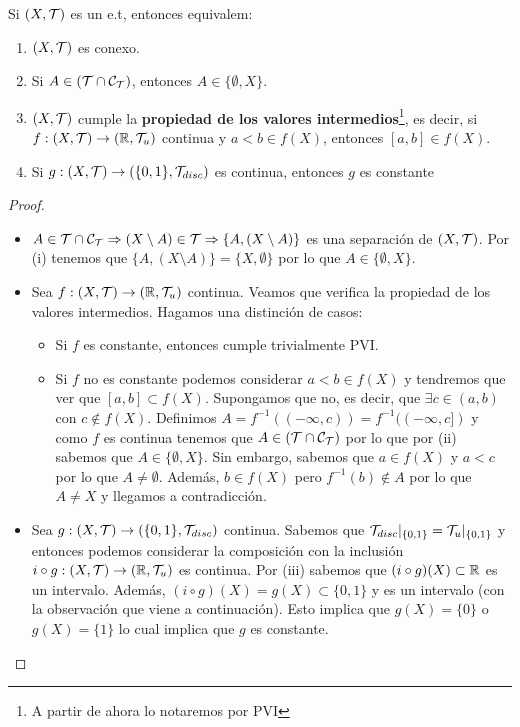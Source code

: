 \begin{teo}
    Si $(X, \mathcal{T})$ es un e.t, entonces equivalem:
    \begin{enumerate}
        \item[(i)] $(X, \mathcal{T})$ es conexo.
        \item[(ii)] Si $A\in (\mathcal{T}\cap \mathcal{C}_{\mathcal{T}})$, entonces $A\in\{\emptyset, X\}$.
        \item[(iii)] $(X, \mathcal{T})$ cumple la \textbf{propiedad de los valores intermedios}\footnote{A partir de ahora lo notaremos por PVI}, es decir, si $f:(X, \mathcal{T})\to (\mathbb{R}, \mathcal{T}_u)$ continua y $a<b\in f(X)$, entonces $[a,b]\in f(X)$.
        \item[(iv)] Si $g:(X, \mathcal{T})\to (\{0,1\}, \mathcal{T}_{disc})$ es continua, entonces $g$ es constante 
    \end{enumerate}
    \begin{proof}\
        \begin{itemize}
            \item[(i)$\Rightarrow$(ii) )] $A\in \mathcal{T}\cap \mathcal{C}_{\mathcal{T}} \Rightarrow (X\setminus A) \in \mathcal{T} \Rightarrow \{A, (X\setminus A)\}$ es una separación de $(X, \mathcal{T})$. Por (i) tenemos que $\{A, (X\setminus A)\}=\{X, \emptyset\}$ por lo que $A\in \{\emptyset, X\}$.
            \item[(ii)$\Rightarrow$(iii) )] Sea $f:(X, \mathcal{T})\to (\mathbb{R}, \mathcal{T}_u)$ continua. Veamos que verifica la propiedad de los valores intermedios. Hagamos una distinción de casos:
            \begin{itemize}
                \item[$\bullet)$] Si $f$ es constante, entonces cumple trivialmente PVI.
                \item[$\bullet)$] Si $f$ no es constante podemos considerar $a<b\in f(X)$ y tendremos que ver que $[a,b]\subset f(X)$. Supongamos que no, es decir, que $\exists c\in (a,b)$ con $c\notin f(X)$. Definimos $A=f^{-1}((-\infty, c)) = f^{-1}((-\infty, c])$ y como $f$ es continua tenemos que $A\in (\mathcal{T}\cap \mathcal{C}_{\mathcal{T}})$ por lo que por (ii) sabemos que $A\in \{\emptyset, X\}$. Sin embargo, sabemos que $a\in f(X)$ y $a<c$ por lo que $A\neq \emptyset$. Además, $b\in f(X)$ pero $f^{-1}(b)\notin A$ por lo que $A\neq X$ y llegamos a contradicción.
            \end{itemize}
            \item[(iii)$\Rightarrow $(iv) )] Sea $g:(X, \mathcal{T}) \to (\{0,1\}, \mathcal{T}_{disc})$ continua. Sabemos que $\mathcal{T}_{disc}|_{\{0,1\}} = \mathcal{T}_u|_{\{0,1\}}$ y entonces podemos considerar la composición con la inclusión $i\circ g:(X, \mathcal{T})\to (\mathbb{R}, \mathcal{T}_u)$ es continua. Por (iii) sabemos que $(i\circ g)(X)\subset \mathbb{R}$ es un intervalo. Además, $(i\circ g)(X) = g(X)\subset \{0,1\}$ y es un intervalo (con la observación que viene a continuación). Esto implica que $g(X)=\{0\}$ o $g(X)=\{1\}$ lo cual implica que $g$ es constante.

\end{itemize}
\end{proof}
\end{teo}
